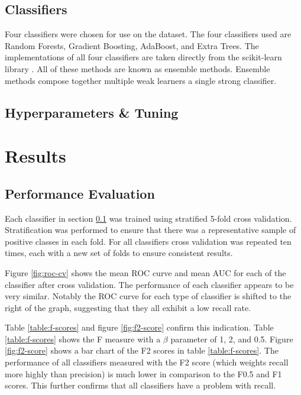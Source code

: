 \documentclass[journal]{IEEEtran}
\begin{document}
\subsection{Classifiers}
\label{subsec:classifiers}
Four classifiers were chosen for use on the dataset. The four classifiers used are Random Forests, Gradient Boosting, AdaBoost, and Extra Trees. The implementations of all four classifiers are taken directly from the scikit-learn library \cite{pedregosa2011scikit}. All of these methods are known as ensemble methods. Ensemble methods compose together multiple weak learners a single strong classifier.

\subsection{Hyperparameters \& Tuning}
\label{subsec:tuning}

\section{Results}
\label{sec:results}

\subsection{Performance Evaluation}
\label{subsec:performance}

Each classifier in section \ref{subsec:classifiers} was trained using stratified 5-fold cross validation. Stratification was performed to ensure that there was a representative sample of positive classes in each fold. For all classifiers cross validation was repeated ten times, each with a new set of folds to ensure consistent results.

Figure \ref{fig:roc-cv} shows the mean ROC curve and mean AUC for each of the classifier after cross validation. The performance of each classifier appears to be very similar. Notably the ROC curve for each type of classifier is shifted to the right of the graph, suggesting that they all exhibit a low recall rate.

Table \ref{table:f-scores} and figure \ref{fig:f2-score} confirm this indication. Table \ref{table:f-scores} shows the F measure with a $\beta$ parameter of 1, 2, and 0.5. Figure \ref{fig:f2-score} shows a bar chart of the F2 scores in table \ref{table:f-scores}. The performance of all classifiers measured with the F2 score (which weights recall more highly than precision) is much lower in comparison to the F0.5 and F1 scores. This further confirms that all classifiers have a problem with recall.
\end{document}
